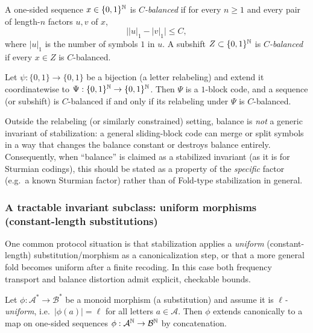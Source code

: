 \begin{definition}[Balance]\label{def:fold-balance}
A one-sided sequence $x\in\{0,1\}^{\mathbb{N}}$ is \emph{$C$-balanced} if for every $n\ge 1$ and every pair of length-$n$ factors $u,v$ of $x$,
\[
\bigl||u|_1-|v|_1\bigr|\le C,
\]
where $|u|_1$ is the number of symbols $1$ in $u$.
A subshift $Z\subset\{0,1\}^{\mathbb{N}}$ is \emph{$C$-balanced} if every $x\in Z$ is $C$-balanced.
\end{definition}

\begin{proposition}\label{prop:fold-balance-relabel}
Let $\psi:\{0,1\}\to\{0,1\}$ be a bijection (a letter relabeling) and extend it coordinatewise to $\Psi:\{0,1\}^{\mathbb{N}}\to\{0,1\}^{\mathbb{N}}$. Then $\Psi$ is a $1$-block code, and a sequence (or subshift) is $C$-balanced if and only if its relabeling under $\Psi$ is $C$-balanced.
\end{proposition}

\begin{remark}\label{rem:fold-balance-not-invariant}
Outside the relabeling (or similarly constrained) setting, balance is \emph{not} a generic invariant of stabilization: a general sliding-block code can merge or split symbols in a way that changes the balance constant or destroys balance entirely. Consequently, when ``balance'' is claimed as a stabilized invariant (as it is for Sturmian codings), this should be stated as a property of the \emph{specific} factor (e.g.\ a known Sturmian factor) rather than of Fold-type stabilization in general.
\end{remark}

\subsubsection{A tractable invariant subclass: uniform morphisms (constant-length substitutions)}\label{sec:stabilization:fold-uniform}

One common protocol situation is that stabilization applies a \emph{uniform} (constant-length) substitution/morphism as a canonicalization step, or that a more general fold becomes uniform after a finite recoding. In this case both frequency transport and balance distortion admit explicit, checkable bounds.\cite{Lothaire2002}

\begin{definition}\label{def:uniform-morphism}
Let $\phi:\mathcal{A}^\ast\to\mathcal{B}^\ast$ be a monoid morphism (a substitution) and assume it is \emph{$\ell$-uniform}, i.e.\ $|\phi(a)|=\ell$ for all letters $a\in\mathcal{A}$.
Then $\phi$ extends canonically to a map on one-sided sequences $\phi:\mathcal{A}^{\mathbb{N}}\to\mathcal{B}^{\mathbb{N}}$ by concatenation.
\end{definition}

